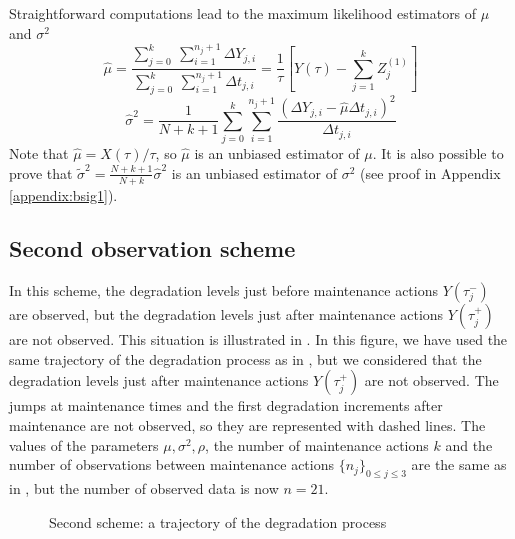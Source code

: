 \noindent Straightforward  computations lead to the maximum likelihood estimators of $\mu$ and $\sigma^2$ 
\begin{equation}
\hat{\mu}=\frac{\sum \limits_{j=0}^{k}\ \sum\limits_{i=1}^{n_j+1} \Delta Y_{j,i}}{\sum \limits_{j=0}^{k}\ \sum\limits_{i=1}^{n_j+1} \Delta t_{j,i}} = \frac{1}{\tau} \left[Y(\tau)-\sum\limits_{j=1}^{k} Z_j^{(1)}\right]
\end{equation}
\begin{equation}
\hat{\sigma}^2=\frac{1}{{N+k+1}}\sum \limits_{j=0}^{k}\sum\limits_{i=1}^{n_j+1} \frac{\displaystyle(\Delta Y_{j,i}-\hat{\mu}\Delta t_{j,i})^2}{ \displaystyle \Delta t_{j,i}}
\label{eq:sigma2_cas1}
\end{equation}
\noindent Note that $\hat{\mu} = X(\tau)/\tau$, so $\hat{\mu}$ is an unbiased estimator of $\mu$.
It is also possible to prove that $\tilde{\sigma}^2={\displaystyle\frac{N+k+1}{N+k}}\hat{\sigma}^2 $ is an unbiased estimator of $\sigma^2$ (see proof in Appendix \ref{appendix:bsig1}). 


\subsection{Second observation scheme}
\label{2case}

In this scheme, the degradation levels just before maintenance actions $Y(\tau_j^-)$ are observed, but the degradation levels just after maintenance actions $Y(\tau_j^+)$ are not observed. This situation is illustrated in . In this figure, we have used the same trajectory of the degradation process as in , but we considered that the degradation levels just after maintenance actions $Y(\tau_j^+)$ are not observed. The jumps at maintenance times and the first degradation increments after maintenance are not observed, so they are represented with dashed lines. The values of the parameters $\mu, \sigma^2,\rho$, the number of maintenance actions $k$ and the number of observations between maintenance actions $\{n_j\}_{0 \leq j \leq 3}$ are the same as in , but the number of observed data is now $n=21$.

\begin{figure}[htbp]
\caption{Second scheme: a trajectory of the degradation process}
\label{fig:cas2}
\end{figure}

